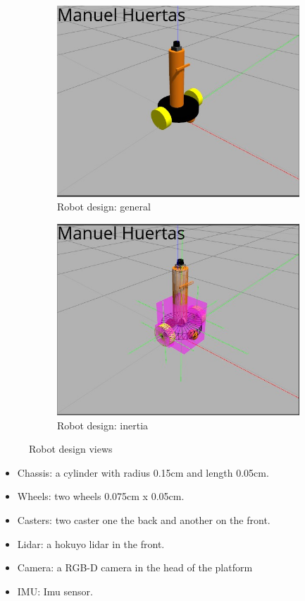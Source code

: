 \documentclass[10pt,journal,compsoc]{IEEEtran}
\begin{document}
\begin{figure}[h]
\centering
\begin{subfigure}[b]{0.2\textwidth}
\includegraphics[scale=0.18]{robot-design-1}
\caption{Robot design: general}
\end{subfigure}
\begin{subfigure}[b]{0.2\textwidth}
\includegraphics[scale=0.18]{robot-design-2}
\caption{Robot design: inertia}
\end{subfigure}
\caption{Robot design views}
\end{figure}

\begin{itemize}
\item Chassis: a cylinder with radius 0.15cm and length 0.05cm.
\item Wheels: two wheels 0.075cm x 0.05cm.
\item Casters: two caster one the back and another on the front.
\item Lidar: a hokuyo lidar in the front.
\item Camera: a RGB-D camera in the head of the platform
\item IMU: Imu sensor. 
\end{itemize}
\end{document}
